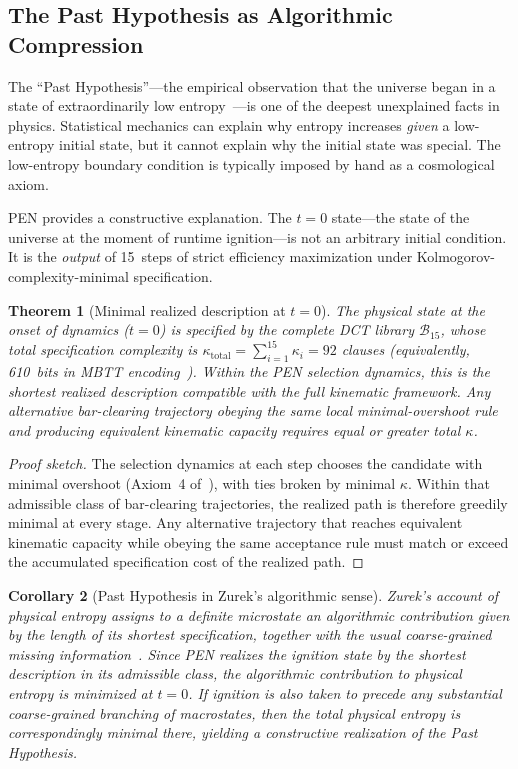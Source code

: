 \documentclass[11pt,a4paper]{article}
\theoremstyle{plain}
\newtheorem{theorem}{Theorem}[section]
\newtheorem{corollary}[theorem]{Corollary}
\theoremstyle{definition}
\theoremstyle{remark}
\newcommand{\B}{\mathcal{B}}
\begin{document}
\subsection{The Past Hypothesis as Algorithmic Compression}
\label{sec:past-hypothesis}

The ``Past Hypothesis''---the empirical observation that the universe began in a state of extraordinarily low entropy~\cite{penrose-road,carroll}---is one of the deepest unexplained facts in physics.
Statistical mechanics can explain why entropy increases \emph{given} a low-entropy initial state, but it cannot explain why the initial state was special.
The low-entropy boundary condition is typically imposed by hand as a cosmological axiom.

PEN provides a constructive explanation.
The $t = 0$ state---the state of the universe at the moment of runtime ignition---is not an arbitrary initial condition.
It is the \emph{output} of 15~steps of strict efficiency maximization under Kolmogorov-complexity-minimal specification.

\begin{theorem}[Minimal realized description at $t = 0$]
\label{thm:past-hypothesis}
The physical state at the onset of dynamics ($t = 0$) is specified by the complete DCT library $\B_{15}$, whose total specification complexity is $\kappa_{\mathrm{total}} = \sum_{i=1}^{15} \kappa_i = 92$ clauses (equivalently, 610~bits in MBTT encoding~\cite{pen}).
Within the PEN selection dynamics, this is the shortest realized description compatible with the full kinematic framework.
Any alternative bar-clearing trajectory obeying the same local minimal-overshoot rule and producing equivalent kinematic capacity requires equal or greater total $\kappa$.
\end{theorem}

\begin{proof}[Proof sketch]
The selection dynamics at each step chooses the candidate with minimal overshoot (Axiom~4 of~\cite{pen}), with ties broken by minimal $\kappa$.
Within that admissible class of bar-clearing trajectories, the realized path is therefore greedily minimal at every stage.
Any alternative trajectory that reaches equivalent kinematic capacity while obeying the same acceptance rule must match or exceed the accumulated specification cost of the realized path.
\end{proof}

\begin{corollary}[Past Hypothesis in Zurek's algorithmic sense]
\label{cor:zurek-past}
Zurek's account of physical entropy assigns to a definite microstate an algorithmic contribution given by the length of its shortest specification, together with the usual coarse-grained missing information~\cite{zurek-complexity}.
Since PEN realizes the ignition state by the shortest description in its admissible class, the algorithmic contribution to physical entropy is minimized at $t = 0$.
If ignition is also taken to precede any substantial coarse-grained branching of macrostates, then the total physical entropy is correspondingly minimal there, yielding a constructive realization of the Past Hypothesis.
\end{corollary}
\end{document}
